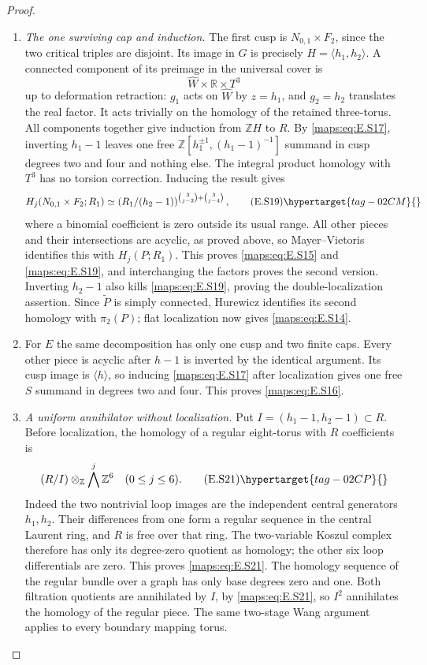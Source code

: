 \begin{proof}
\begin{enumerate}[label={$\langle1\rangle$\arabic*.},leftmargin=*]
\item \emph{The one surviving cap and induction.}
The first cusp is $N_{0,1}\times F_2$, since the two critical
triples are disjoint. Its image in $G$ is precisely
$H=\langle h_1,h_2\rangle$. A connected component of its
preimage in the universal cover is
\[
                \widehat W\times\mathbb R\times T^3
\]
up to deformation retraction: $g_1$ acts on $\widehat W$ by
$z=h_1$, and $g_2=h_2$ translates the real factor. It acts
trivially on the homology of the retained three-torus. All
components together give induction from $\mathbb ZH$ to
$R$. By \eqref{maps:eq:E.S17}, inverting $h_1-1$ leaves one free
$\mathbb Z[h_1^{\pm1},(h_1-1)^{-1}]$ summand in cusp degrees
two and four and nothing else. The integral product homology
with $T^3$ has no torsion correction. Inducing the result gives
\[
 H_j(N_{0,1}\times F_2;R_1)
   \simeq
 \left(R_1/(h_2-1)\right)^{
           \binom3{j-2}+\binom3{j-4}},
 \tag{E.S19}\hypertarget{tag-02CM}{}\label{maps:eq:E.S19}
\]
where a binomial coefficient is zero outside its usual range.
All other pieces and their intersections are acyclic, as
proved above, so Mayer--Vietoris identifies this with
$H_j(P;R_1)$. This proves \eqref{maps:eq:E.S15} and \eqref{maps:eq:E.S19}, and interchanging
the factors proves the second version. Inverting $h_2-1$
also kills \eqref{maps:eq:E.S19}, proving the double-localization assertion.
Since $\widetilde P$ is simply connected, Hurewicz identifies
its second homology with $\pi_2(P)$; flat localization now
gives \eqref{maps:eq:E.S14}.

\item For $E$ the same decomposition has only one cusp and two
finite caps. Every other piece is acyclic after $h-1$ is
inverted by the identical argument. Its cusp image is
$\langle h\rangle$, so inducing \eqref{maps:eq:E.S17} after localization
gives one free $S$ summand in degrees two and four. This
proves \eqref{maps:eq:E.S16}.

\item \emph{A uniform annihilator without localization.}
Put $I=(h_1-1,h_2-1)\subset R$. Before localization, the homology
of a regular eight-torus with $R$ coefficients is
\[
                 (R/I)\otimes_{\mathbb Z}\bigwedge^j\mathbb Z^6
                      \quad(0\leq j\leq6).
 \tag{E.S21}\hypertarget{tag-02CP}{}\label{maps:eq:E.S21}
\]
Indeed the two nontrivial loop images are the independent central
generators $h_1,h_2$. Their differences from one form a regular
sequence in the central Laurent ring, and $R$ is free over that
ring. The two-variable Koszul complex therefore has only its
degree-zero quotient as homology; the other six loop differentials
are zero. This proves \eqref{maps:eq:E.S21}.
The homology sequence of the regular bundle over a graph has
only base degrees zero and one. Both filtration quotients are
annihilated by $I$, by \eqref{maps:eq:E.S21}, so $I^2$ annihilates the homology
of the regular piece. The same two-stage Wang argument applies
to every boundary mapping torus. 


\end{enumerate}
\end{proof}
